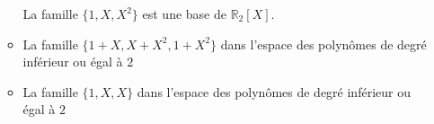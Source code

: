 \begin{itemize}
\begin{itemize}
{            \begin{mdframed}
                La famille $\{1, X, X^2\}$ est une base de $\mathbb{R}_2[X]$.
            \end{mdframed}
        }{}
        \item La famille $\{1+X, X+X^2, 1+X^2\}$ dans l'espace des polynômes de degré inférieur ou égal à $2$   
        \item La famille $\{1, X, X\}$ dans l'espace des polynômes de degré inférieur ou égal à $2$
    \end{itemize}
\end{itemize}

